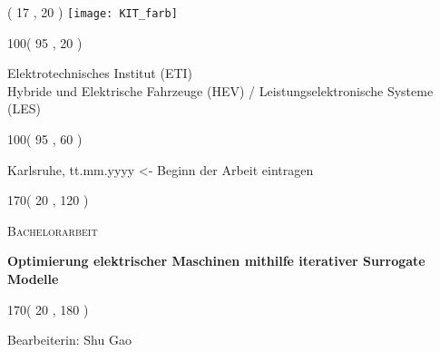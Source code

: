 %
%

\thispagestyle{empty}

\begin{textblock}{50}( 17 , 20 )
\texttt{[image: KIT\_farb]}
\end{textblock}

\begin{textblock}{100}( 95 , 20 )
\begin{flushright}
Elektrotechnisches Institut (ETI)\\
Hybride und Elektrische Fahrzeuge (HEV) / Leistungselektronische Systeme (LES)	%
\end{flushright}
\end{textblock}


\begin{textblock}{100}( 95 , 60 )
\begin{flushright}
\large
Karlsruhe, tt.mm.yyyy <- Beginn der Arbeit eintragen    				          	%
\end{flushright}
\end{textblock}

\begin{textblock}{170}( 20 , 120 )
\begin{center}
    \begin{LARGE}
    \textsc{Bachelorarbeit}\\			%
    \end{LARGE}
\vspace{0.5cm}
    \begin{huge}
    \textbf{Optimierung elektrischer Maschinen mithilfe iterativer Surrogate Modelle}\\[1cm]           									%
    \end{huge}
\end{center}
\end{textblock}

\begin{textblock}{170}( 20 , 180 )
\begin{center}
\large
Bearbeiterin: Shu Gao \\           									%
\end{center}
\end{textblock}

